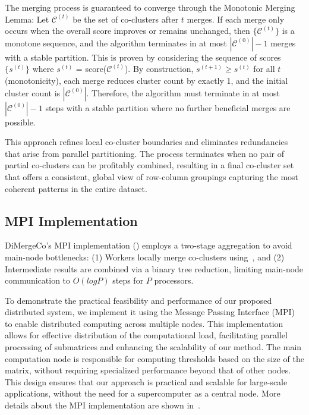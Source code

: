 \documentclass[journal]{IEEEtran}
\begin{document}
The merging process is guaranteed to converge through the Monotonic Merging Lemma: Let $\mathcal{C}^{(t)}$ be the set of co-clusters after $t$ merges. If each merge only occurs when the overall score improves or remains unchanged, then $\{\mathcal{C}^{(t)}\}$ is a monotone sequence, and the algorithm terminates in at most $|\mathcal{C}^{(0)}|-1$ merges with a stable partition. This is proven by considering the sequence of scores $\{s^{(t)}\}$ where $s^{(t)}$ = score($\mathcal{C}^{(t)}$). By construction, $s^{(t+1)} \geq s^{(t)}$ for all $t$ (monotonicity), each merge reduces cluster count by exactly 1, and the initial cluster count is $|\mathcal{C}^{(0)}|$. Therefore, the algorithm must terminate in at most $|\mathcal{C}^{(0)}|-1$ steps with a stable partition where no further beneficial merges are possible.

This approach refines local co-cluster boundaries and eliminates redundancies that arise from parallel partitioning. The process terminates when no pair of partial co-clusters can be profitably combined, resulting in a final co-cluster set that offers a consistent, global view of row-column groupings capturing the most coherent patterns in the entire dataset.

\subsection{MPI Implementation}
\label{subsec:mpi-implementation}
DiMergeCo's MPI implementation () employs a two-stage aggregation to avoid main-node bottlenecks: (1) Workers locally merge co-clusters using~, and (2) Intermediate results are combined via a binary tree reduction, limiting main-node communication to $O(log P)$ steps for $P$ processors.

To demonstrate the practical feasibility and performance of our proposed distributed system, we implement it using the Message Passing Interface (MPI) to enable distributed computing across multiple nodes. This implementation allows for effective distribution of the computational load, facilitating parallel processing of submatrices and enhancing the scalability of our method. The main computation node is responsible for computing thresholds based on the size of the matrix, without requiring specialized performance beyond that of other nodes. This design ensures that our approach is practical and scalable for large-scale applications, without the need for a supercomputer as a central node.
More details about the MPI implementation are shown in~.
\end{document}
